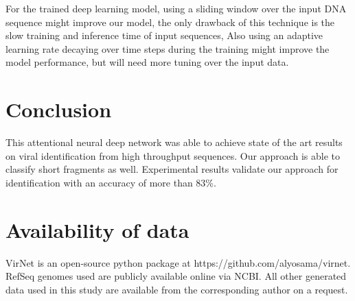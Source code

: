 \documentclass[conference]{IEEEtran}
\begin{document}
For the trained deep learning model, using a sliding window over the input DNA sequence might improve our model, the only drawback of this technique is the slow training and inference time of input sequences, Also using an adaptive learning rate decaying over time steps during the training might improve the model performance, but will need more tuning over the input data.

\section{Conclusion}

This attentional neural deep network was able to achieve state of the art results on viral identification from high throughput sequences. Our approach is able to classify short fragments as well. Experimental results validate our approach for identification with an accuracy of more than 83\%. %




\section*{Availability of data}

VirNet is an open-source python package at https://github.com/alyosama/virnet. RefSeq genomes used are publicly available online via NCBI. All other generated data used in this study are available from the corresponding author on a request. 




\end{document}
